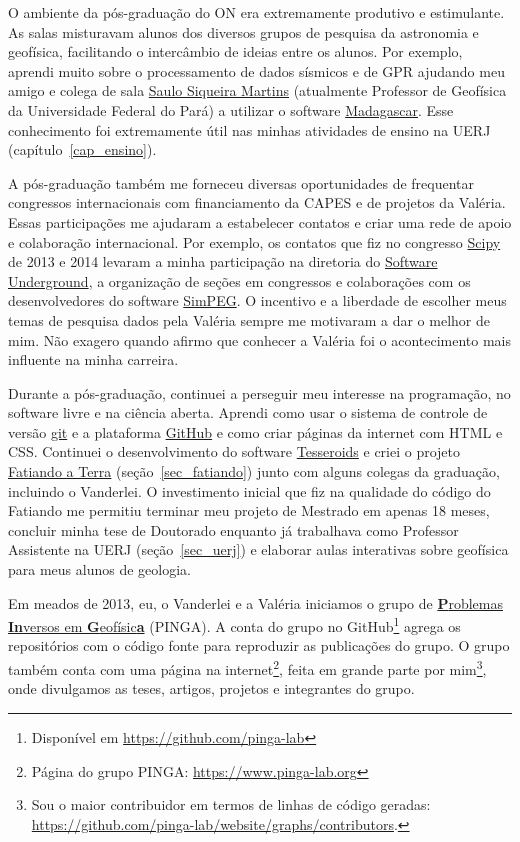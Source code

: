 \documentclass[10pt,a4paper,oneside]{book}
\begin{document}
O ambiente da pós-graduação do ON era extremamente produtivo e estimulante.
As salas misturavam alunos dos diversos grupos de pesquisa da astronomia e
geofísica, facilitando o intercâmbio de ideias entre os alunos.
Por exemplo, aprendi muito sobre o processamento de dados sísmicos e de GPR
ajudando meu amigo e colega de sala
\href{https://www.linkedin.com/in/saulo-siqueira-martins-78770878/}{Saulo Siqueira Martins}
(atualmente Professor de Geofísica da Universidade Federal do Pará)
a utilizar o software \href{https://www.reproducibility.org/}{Madagascar}.
Esse conhecimento foi extremamente útil nas minhas atividades de ensino na
UERJ (capítulo~\ref{cap_ensino}).

A pós-graduação também me forneceu diversas oportunidades de frequentar
congressos internacionais com financiamento da CAPES e de projetos da Valéria.
Essas participações me ajudaram a estabelecer contatos e criar uma rede de
apoio e colaboração internacional.
Por exemplo, os contatos que fiz no congresso
\href{https://conference.scipy.org/scipy2014/}{Scipy} de 2013 e 2014 levaram a
minha participação na diretoria do
\href{https://softwareunderground.org/}{Software Underground}, a organização
de seções em congressos e colaborações com os desenvolvedores do software
\href{https://simpeg.xyz/}{SimPEG}.
O incentivo e a liberdade de escolher meus temas de pesquisa dados pela Valéria
sempre me motivaram a dar o melhor de mim.
Não exagero quando afirmo que conhecer a Valéria foi o acontecimento mais
influente na minha carreira.

Durante a pós-graduação, continuei a perseguir meu interesse na programação,
no software livre e na ciência aberta.
Aprendi como usar o sistema de controle de versão
\href{https://git-scm.com/}{git} e a plataforma
\href{https://github.com}{GitHub} e como criar páginas da internet com HTML e
CSS.
Continuei o desenvolvimento do software \href{https://tesseroids.leouieda.com/}{Tesseroids}
e criei o projeto \href{https://www.fatiando.org}{Fatiando a Terra}
(seção~\ref{sec_fatiando}) junto com alguns colegas da graduação, incluindo o
Vanderlei.
O investimento inicial que fiz na qualidade do código do Fatiando me
permitiu terminar meu projeto de Mestrado em apenas 18 meses,
concluir minha tese de Doutorado enquanto já trabalhava como Professor
Assistente na UERJ (seção~\ref{sec_uerj}) e elaborar aulas interativas sobre
geofísica para meus alunos de geologia.

Em meados de 2013, eu, o Vanderlei e a Valéria iniciamos o grupo de
\href{https://www.pinga-lab.org/}{\textbf{P}roblemas \textbf{In}versos em \textbf{G}eofísic\textbf{a}}
(PINGA).
A conta do grupo no GitHub\footnote{Disponível em \url{https://github.com/pinga-lab}}
agrega os repositórios com o código fonte para reproduzir as publicações do
grupo.
O grupo também conta com uma página na internet\footnote{Página do grupo PINGA: \url{https://www.pinga-lab.org}},
feita em grande parte por mim\footnote{Sou o maior contribuidor em termos de
linhas de código geradas:
\url{https://github.com/pinga-lab/website/graphs/contributors}.},
onde divulgamos as teses, artigos, projetos e integrantes do grupo.
\end{document}
